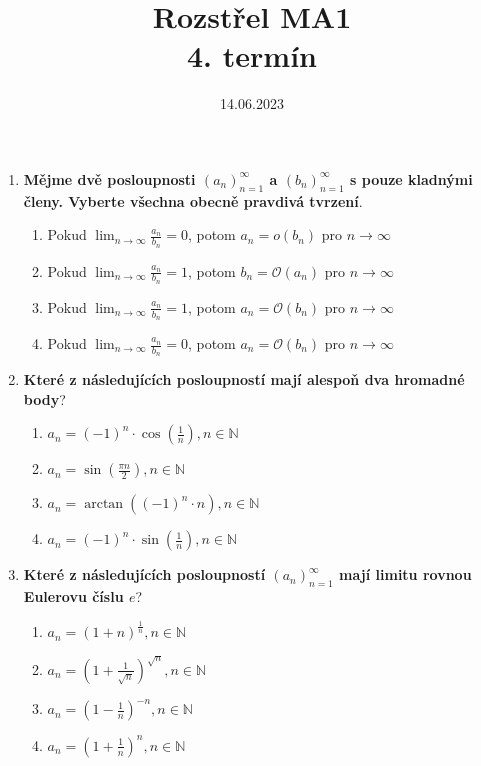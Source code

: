 \documentclass{article}
\title{
Rozstřel MA1 \\
\large 4. termín
}
\date{14.06.2023}
\begin{document}
\maketitle

\begin{enumerate}
    \item \textbf{Mějme dvě posloupnosti $(a_n)_{n=1}^{\infty}$ a $(b_n)_{n=1}^{\infty}$ s pouze kladnými členy. Vyberte všechna obecně pravdivá tvrzení}.
    \begin{enumerate}
        \item Pokud $\lim_{n \to \infty} \frac{a_n}{b_n} = 0$, potom $a_n = o(b_n)$ pro $n \to \infty$
        \item Pokud $\lim_{n \to \infty} \frac{a_n}{b_n} = 1$, potom $b_n = \mathcal{O}(a_n)$ pro $n \to \infty$
        \item Pokud $\lim_{n \to \infty} \frac{a_n}{b_n} = 1$, potom $a_n = \mathcal{O}(b_n)$ pro $n \to \infty$
        \item Pokud $\lim_{n \to \infty} \frac{a_n}{b_n} = 0$, potom $a_n = \mathcal{O}(b_n)$ pro $n \to \infty$
    \end{enumerate}

    \item \textbf{Které z následujících posloupností mají alespoň dva hromadné body}?
    \begin{enumerate}
        \item $a_n = (-1)^n \cdot \cos(\frac{1}{n}), n \in \mathbb{N}$
        \item $a_n = \sin(\frac{\pi n}{2}), n \in \mathbb{N}$
        \item $a_n = \arctan((-1)^n \cdot n), n \in \mathbb{N}$
        \item $a_n = (-1)^n \cdot \sin(\frac{1}{n}), n \in \mathbb{N}$
    \end{enumerate}

    \item \textbf{Které z následujících posloupností $(a_n)_{n=1}^\infty$ mají limitu rovnou Eulerovu číslu $e$}?
    \begin{enumerate}
        \item $a_n = (1+n)^\frac{1}{n}, n \in \mathbb{N}$
        \item $a_n = (1 + \frac{1}{\sqrt{n}})^{\sqrt{n}}, n \in \mathbb{N}$
        \item $a_n = (1 - \frac{1}{n})^{-n}, n \in \mathbb{N}$
        \item $a_n = (1 + \frac{1}{n})^n, n \in \mathbb{N}$
    \end{enumerate}


\end{enumerate}
\end{document}
